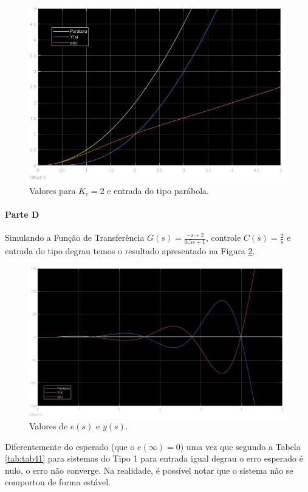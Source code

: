 \documentclass[
]{book}
\begin{document}
\begin{figure}
\includegraphics[width=0.8\linewidth]{Imagens/Lab4/Resolução/prob2C1} \caption{Valores para $K_c = 2$ e entrada do tipo parábola.}\label{fig:fig42C1}
\end{figure}

\hypertarget{parte-d}{%
\paragraph*{Parte D}\label{parte-d}}

Simulando a Função de Transferência \(G(s) = \frac {-s+2}{0.5s +1}\), controle \(C(s) = \frac {2}{s}\) e entrada do tipo degrau temos o resultado apresentado na Figura \ref{fig:fig42D1}.

\begin{figure}
\includegraphics[width=0.8\linewidth]{Imagens/Lab4/Resolução/prob2D1} \caption{Valores de $e(s)$ e $y(s)$.}\label{fig:fig42D1}
\end{figure}

Diferentemente do esperado (que o \(e(\infty) = 0\)) uma vez que segundo a Tabela \ref{tab:tab41} para sistemas do Tipo 1 para entrada igual degrau o erro esperado é nulo, o erro não converge. Na realidade, é possível notar que o sistema não se comportou de forma estável.
\end{document}
